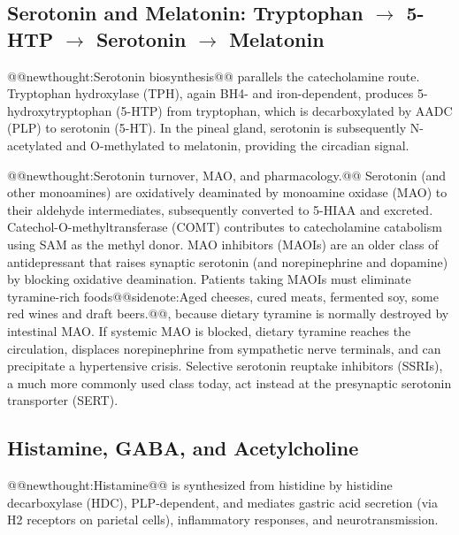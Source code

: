 \documentclass{tufte-handout}
\makeatletter
\def\newthought#1{@@newthought:#1@@}
\def\sidenote#1{@@sidenote:#1@@}
\makeatother
\begin{document}
\subsection{Serotonin and Melatonin: Tryptophan \texorpdfstring{$\rightarrow$}{->} 5-HTP \texorpdfstring{$\rightarrow$}{->} Serotonin \texorpdfstring{$\rightarrow$}{->} Melatonin}
\newthought{Serotonin biosynthesis} parallels the catecholamine route. Tryptophan hydroxylase (TPH), again BH4- and iron-dependent, produces 5-hydroxytryptophan (5-HTP) from tryptophan, which is decarboxylated by AADC (PLP) to serotonin (5-HT). In the pineal gland, serotonin is subsequently N-acetylated and O-methylated to melatonin, providing the circadian signal.

\newthought{Serotonin turnover, MAO, and pharmacology.} Serotonin (and other monoamines) are oxidatively deaminated by monoamine oxidase (MAO) to their aldehyde intermediates, subsequently converted to 5-HIAA and excreted. Catechol-O-methyltransferase (COMT) contributes to catecholamine catabolism using SAM as the methyl donor. MAO inhibitors (MAOIs) are an older class of antidepressant that raises synaptic serotonin (and norepinephrine and dopamine) by blocking oxidative deamination. Patients taking MAOIs must eliminate tyramine-rich foods\sidenote{Aged cheeses, cured meats, fermented soy, some red wines and draft beers.}, because dietary tyramine is normally destroyed by intestinal MAO. If systemic MAO is blocked, dietary tyramine reaches the circulation, displaces norepinephrine from sympathetic nerve terminals, and can precipitate a hypertensive crisis. Selective serotonin reuptake inhibitors (SSRIs), a much more commonly used class today, act instead at the presynaptic serotonin transporter (SERT).

\subsection{Histamine, GABA, and Acetylcholine}
\newthought{Histamine} is synthesized from histidine by histidine decarboxylase (HDC), PLP-dependent, and mediates gastric acid secretion (via H2 receptors on parietal cells), inflammatory responses, and neurotransmission.
\end{document}
